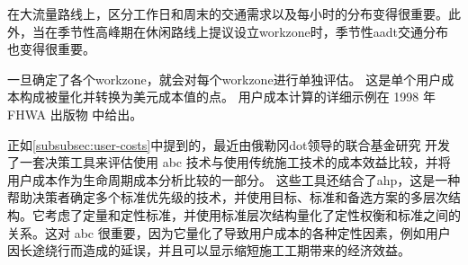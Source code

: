 在大流量路线上，区分工作日和周末的交通需求以及每小时的分布变得很重要。此外，当在季节性高峰期在休闲路线上提议设立\gls*{workzone}时，季节性\acrlong*{aadt}交通分布也变得很重要。

一旦确定了各个\gls*{workzone}，就会对每个\gls*{workzone}进行单独评估。 这是单个用户成本构成被量化并转换为美元成本值的点。 用户成本计算的详细示例在 1998 年 FHWA 出版物  \cite{walls1998l} 中给出。

正如\cref{subsubsec:user-costs}中提到的，最近由俄勒冈\acrlong*{dot}领导的联合基金研究 \cite{doolen2011a} 开发了一套决策工具来评估使用 \acrshort*{abc} 技术与使用传统施工技术的成本效益比较，并将用户成本作为生命周期成本分析比较的一部分。 这些工具还结合了\acrfull{ahp}，这是一种帮助决策者确定多个标准优先级的技术，并使用目标、标准和备选方案的多层次结构。它考虑了定量和定性标准，并使用标准层次结构量化了定性权衡和标准之间的关系。这对 \acrshort*{abc} 很重要，因为它量化了导致用户成本的各种定性因素，例如用户因长途绕行而造成的延误，并且可以显示缩短施工工期带来的经济效益。


